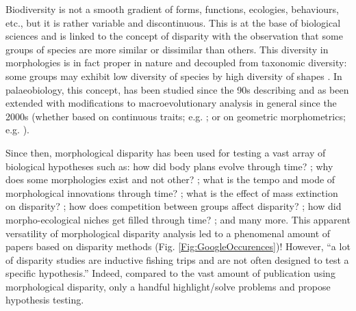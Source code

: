 \documentclass[12pt,letterpaper]{article}
\begin{document}
Biodiversity is not a smooth gradient of forms, functions, ecologies, behaviours, etc., but it is rather variable and discontinuous. %
This is at the base of biological sciences and is linked to the concept of disparity \citep{Wills2001,Hopkins2017} with the observation that some groups of species are more similar or dissimilar than others.
This diversity in morphologies is in fact proper in nature and decoupled from taxonomic diversity: some groups may exhibit low diversity of species by high diversity of shapes \citep[or the other way around]{ruta2013,hopkinsdecoupling2013}.
In palaeobiology, this concept, has been studied since the 90s describing \citep{gould1989wonderful,gould1991disparity,briggs1992morphological,Wills1994,Foote01071994,Foote29111996,jernvall1996molar,foote1997evolution} and as been extended with modifications to macroevolutionary analysis in general since the 2000s (whether based on continuous traits; e.g. \citealt{Harmon961,geiger2008}; or on geometric morphometrics; e.g. \citealt{claude2008morphometrics,zelditch2012geometric,adams2013geomorph,adams2017geometric}).

Since then, morphological disparity has been used for testing a vast array of biological hypotheses such as: how did body plans evolve through time? \citep{Wesley-Hunt2005}; why does some morphologies exist and not other? \cite{gerber2017geometry}; what is the tempo and mode of morphological innovations through time? \citep{Hughes20082013}; what is the effect of mass extinction on disparity? \citep{halliday2016eutherian}; how does competition between groups affect disparity? \citep{Brusatte12092008}; how did morpho-ecological niches get filled through time? \citep{price2014niche}; and many more.
%
This apparent versatility of morphological disparity analysis led to a phenomenal amount of papers based on disparity methods (Fig. \ref{Fig:GoogleOccurences})!
%
However, ``a lot of disparity studies are inductive fishing trips and are not often designed to test a specific hypothesis.''
%
Indeed, compared to the vast amount of publication using morphological disparity, only a handful highlight/solve problems and propose hypothesis testing.
\end{document}
